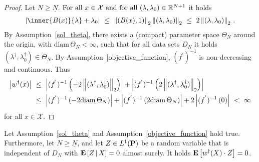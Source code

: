 \begin{proof}
  Let $N\ge \underline{N}$.
  $
    \text{For all}\ 
    x\in\mathcal{X}
    \
    \text{and for all}\ 
    (\lambda,\lambda_0)\in \R^{N+1}
  $ it holds
  \begin{gather*}
    \left| 
    \inner{B(x)}{\lambda}
    +
    \lambda_0
    \right|
    \ 
    \le
    \ 
    \norm{(B(x),1)}_2
    \norm{(\lambda,\lambda_0)}_2
    \ 
    \le
    \ 
    2
    \norm{(\lambda,\lambda_0)}_2
    \,.
  \end{gather*}
  By Assumption~\ref{sol_theta}, 
  there exists a (compact) parameter space
  $\Theta_N$ around the origin, with $\mathrm{diam}\,  \Theta_N<\infty$, 
  such that for all data sets $D_N$ it holds  $(\lambda^\dagger,\lambda_0^\dagger)\in\Theta_N$.
  By Assumption~\ref{objective_function}, $(f^{'})^{-1}$ is non-decreasing and continuous. Thus
  \begin{align*}
    \left| 
    w^\dagger(x)
    \right|
    &
    \ 
    \le
    \ 
    \left| 
    (f^{'})^{-1}
    \left( 
      -2
      \norm{(\lambda^\dagger,\lambda^\dagger_0)}_2
    \right)
    \right|
    +
    \left| 
    (f^{'})^{-1}
    \left( 
      2
      \norm{(\lambda^\dagger,\lambda^\dagger_0)}_2
    \right)
    \right|
    \\
    &
    \ 
    \le
    \ 
    \left| 
    (f^{'})^{-1}
    \left( 
      -2
      \mathrm{diam}\,\Theta_N
    \right)
    \right|
    +
    \left| 
    (f^{'})^{-1}
    \left( 
      2
      \mathrm{diam}\,\Theta_N
    \right)
    \right|
    +
    2
    \left| 
    (f^{'})^{-1}
    \left( 
      0
    \right)
    \right|
    \ 
    <
    \ 
    \infty
  \end{align*}
  for all $x\in\mathcal{X}$.
\end{proof}
\begin{lemma}
  Let Assumption~\ref{sol_theta} and Assumption~\ref{objective_function} hold true.
  Furthermore, 
  let
  $N\ge\underline{N}$, and
  let
  $Z\in L^1(\P)$
  be a random variable that is independent of $D_N$ 
  with
  $
\E
\left[
  Z
  \,
  |
  \, 
  X
\right]
= 0
  $
  almost surely.
  It holds
  $
  \E
  \left[
  w^\dagger(X)\cdot Z
  \right]
  =0
  $.
\end{lemma}
